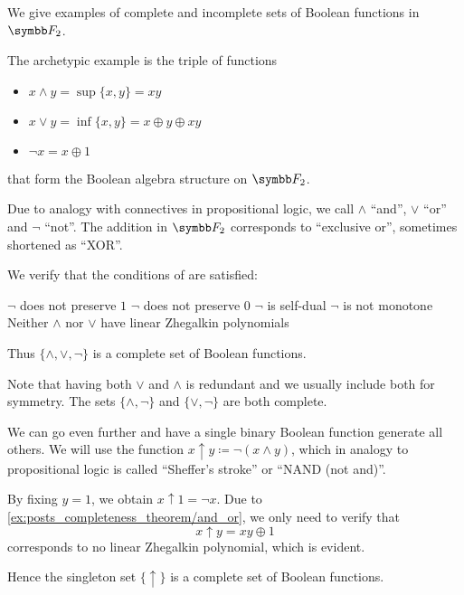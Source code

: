 \begin{example}\label{ex:posts_completeness_theorem}
  We give examples of complete and incomplete sets of Boolean functions in \( \F_2 \).

  \begin{exenum}
     The archetypic example is the triple of functions
    \begin{itemize}
     \item \( x \land y = \sup \{ x, y \} = xy \)
     \item \( x \lor y = \inf \{ x, y \} = x \oplus y \oplus xy \)
     \item \( \neg x = x \oplus 1 \)
    \end{itemize}
    that form the Boolean algebra structure on \( \F_2 \).

    Due to analogy with connectives in propositional logic, we call \( \land \) \enquote{and}, \( \lor \) \enquote{or} and \( \neg \) \enquote{not}. The addition in \( \F_2 \) corresponds to \enquote{exclusive or}, sometimes shortened as \enquote{XOR}.

    We verify that the conditions of  are satisfied:
    \begin{description}
       \( \neg \) does not preserve \( 1 \)
       \( \neg \) does not preserve \( 0 \)
       \( \neg \) is self-dual
       \( \neg \) is not monotone
       Neither \( \land \) nor \( \lor \) have linear Zhegalkin polynomials
    \end{description}

    Thus \( \{ \land, \lor, \neg \} \) is a complete set of Boolean functions.

    Note that having both \( \lor \) and \( \land \) is redundant and we usually include both for symmetry. The sets \( \{ \land, \neg \} \) and \( \{ \lor, \neg \} \) are both complete.

     We can go even further and have a single binary Boolean function generate all others. We will use the function \( x \uparrow y \coloneqq \neg(x \land y) \), which in analogy to propositional logic is called \enquote{Sheffer's stroke} or \enquote{NAND (not and)}.

    By fixing \( y = 1 \), we obtain \( x \uparrow 1 = \neg x \). Due to \cref{ex:posts_completeness_theorem/and_or}, we only need to verify that
    \begin{equation*}
      x \uparrow y = xy \oplus 1
    \end{equation*}
    corresponds to no linear Zhegalkin polynomial, which is evident.

    Hence the singleton set \( \{ \uparrow \} \) is a complete set of Boolean functions.
  \end{exenum}
\end{example}
